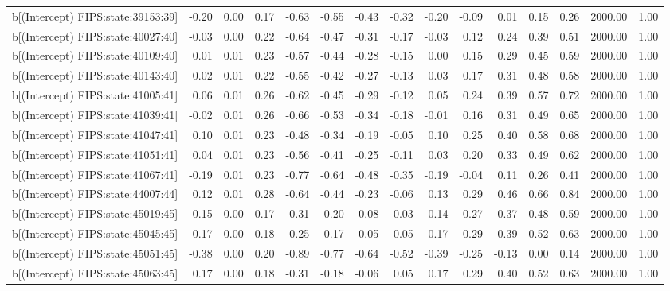 \begin{table}[ht]
\begin{tabular}{rrrrrrrrrrrrrrr}
  b[(Intercept) FIPS:state:39153:39] & -0.20 & 0.00 & 0.17 & -0.63 & -0.55 & -0.43 & -0.32 & -0.20 & -0.09 & 0.01 & 0.15 & 0.26 & 2000.00 & 1.00 \\ 
  b[(Intercept) FIPS:state:40027:40] & -0.03 & 0.00 & 0.22 & -0.64 & -0.47 & -0.31 & -0.17 & -0.03 & 0.12 & 0.24 & 0.39 & 0.51 & 2000.00 & 1.00 \\ 
  b[(Intercept) FIPS:state:40109:40] & 0.01 & 0.01 & 0.23 & -0.57 & -0.44 & -0.28 & -0.15 & 0.00 & 0.15 & 0.29 & 0.45 & 0.59 & 2000.00 & 1.00 \\ 
  b[(Intercept) FIPS:state:40143:40] & 0.02 & 0.01 & 0.22 & -0.55 & -0.42 & -0.27 & -0.13 & 0.03 & 0.17 & 0.31 & 0.48 & 0.58 & 2000.00 & 1.00 \\ 
  b[(Intercept) FIPS:state:41005:41] & 0.06 & 0.01 & 0.26 & -0.62 & -0.45 & -0.29 & -0.12 & 0.05 & 0.24 & 0.39 & 0.57 & 0.72 & 2000.00 & 1.00 \\ 
  b[(Intercept) FIPS:state:41039:41] & -0.02 & 0.01 & 0.26 & -0.66 & -0.53 & -0.34 & -0.18 & -0.01 & 0.16 & 0.31 & 0.49 & 0.65 & 2000.00 & 1.00 \\ 
  b[(Intercept) FIPS:state:41047:41] & 0.10 & 0.01 & 0.23 & -0.48 & -0.34 & -0.19 & -0.05 & 0.10 & 0.25 & 0.40 & 0.58 & 0.68 & 2000.00 & 1.00 \\ 
  b[(Intercept) FIPS:state:41051:41] & 0.04 & 0.01 & 0.23 & -0.56 & -0.41 & -0.25 & -0.11 & 0.03 & 0.20 & 0.33 & 0.49 & 0.62 & 2000.00 & 1.00 \\ 
  b[(Intercept) FIPS:state:41067:41] & -0.19 & 0.01 & 0.23 & -0.77 & -0.64 & -0.48 & -0.35 & -0.19 & -0.04 & 0.11 & 0.26 & 0.41 & 2000.00 & 1.00 \\ 
  b[(Intercept) FIPS:state:44007:44] & 0.12 & 0.01 & 0.28 & -0.64 & -0.44 & -0.23 & -0.06 & 0.13 & 0.29 & 0.46 & 0.66 & 0.84 & 2000.00 & 1.00 \\ 
  b[(Intercept) FIPS:state:45019:45] & 0.15 & 0.00 & 0.17 & -0.31 & -0.20 & -0.08 & 0.03 & 0.14 & 0.27 & 0.37 & 0.48 & 0.59 & 2000.00 & 1.00 \\ 
  b[(Intercept) FIPS:state:45045:45] & 0.17 & 0.00 & 0.18 & -0.25 & -0.17 & -0.05 & 0.05 & 0.17 & 0.29 & 0.39 & 0.52 & 0.63 & 2000.00 & 1.00 \\ 
  b[(Intercept) FIPS:state:45051:45] & -0.38 & 0.00 & 0.20 & -0.89 & -0.77 & -0.64 & -0.52 & -0.39 & -0.25 & -0.13 & 0.00 & 0.14 & 2000.00 & 1.00 \\ 
  b[(Intercept) FIPS:state:45063:45] & 0.17 & 0.00 & 0.18 & -0.31 & -0.18 & -0.06 & 0.05 & 0.17 & 0.29 & 0.40 & 0.52 & 0.63 & 2000.00 & 1.00 \\ 

\end{tabular}
\end{table}
